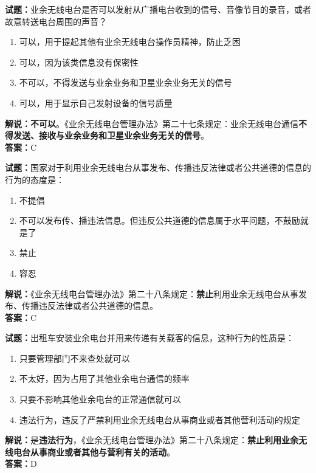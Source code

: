 \documentclass{ctexbook}
\begin{document}
\bigskip


\noindent\textbf{试题：}业余无线电台是否可以发射从广播电台收到的信号、音像节目的录音，或者故意转送电台周围的声音？
\begin{enumerate}[leftmargin=3em]
\item 可以，用于提起其他有业余无线电台操作员精神，防止乏困
\item 可以，因为该类信息没有保密性
\item 不可以，不得发送与业余业务和卫星业余业务无关的信号
\item 可以，用于显示自己发射设备的信号质量
\end{enumerate}
\textbf{解说：不可以}。《业余无线电台管理办法》第二十七条规定：业余无线电台通信\textbf{不得发送、接收与业余业务和卫星业余业务无关的信号}。\\\noindent\textbf{答案：}C





\bigskip


\noindent\textbf{试题：}国家对于利用业余无线电台从事发布、传播违反法律或者公共道德的信息的行为的态度是：
\begin{enumerate}[leftmargin=3em]
\item 不提倡
\item 不可以发布传、播违法信息。但违反公共道德的信息属于水平问题，不鼓励就是了
\item 禁止
\item 容忍
\end{enumerate}
\noindent\textbf{解说：}《业余无线电台管理办法》第二十八条规定：\textbf{禁止}利用业余无线电台从事发布、传播违反法律或者公共道德的信息。\\\noindent\textbf{答案：}C



\bigskip


\noindent\textbf{试题：}出租车安装业余电台并用来传递有关载客的信息，这种行为的性质是：
\begin{enumerate}[leftmargin=3em]
\item 只要管理部门不来查处就可以
\item 不太好，因为占用了其他业余电台通信的频率
\item 只要不影响其他业余电台的正常通信就可以
\item 违法行为，违反了严禁利用业余无线电台从事商业或者其他营利活动的规定%
\end{enumerate}
\noindent\textbf{解说：}是\textbf{违法行为}，《业余无线电台管理办法》第二十八条规定：\textbf{禁止利用业余无线电台从事商业或者其他与营利有关的活动}。\\\noindent\textbf{答案：}D
\end{document}
